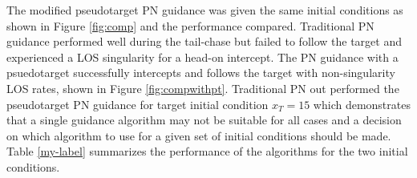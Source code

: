\documentclass[]{aiaa-tc}%
\begin{document}
The modified pseudotarget PN guidance was given the same initial conditions as shown in Figure \ref{fig:comp} and the performance compared. Traditional PN guidance performed well during the tail-chase but failed to follow the target and experienced a LOS singularity for a head-on intercept. The PN guidance with a psuedotarget successfully intercepts and follows the target with non-singularity LOS rates, shown in Figure \ref{fig:compwithpt}. Traditional PN out performed the pseudotarget PN guidance for target initial condition $x_{T} = 15$ which demonstrates that a single guidance algorithm may not be suitable for all cases and a decision on which algorithm to use for a given set of initial conditions should be made. Table \ref{my-label} summarizes the performance of the algorithms for the two initial conditions.

\begin{figure}[H]
 \begin{subfigmatrix}{2}%
\centering

\end{subfigmatrix}
\end{figure}
\end{document}
